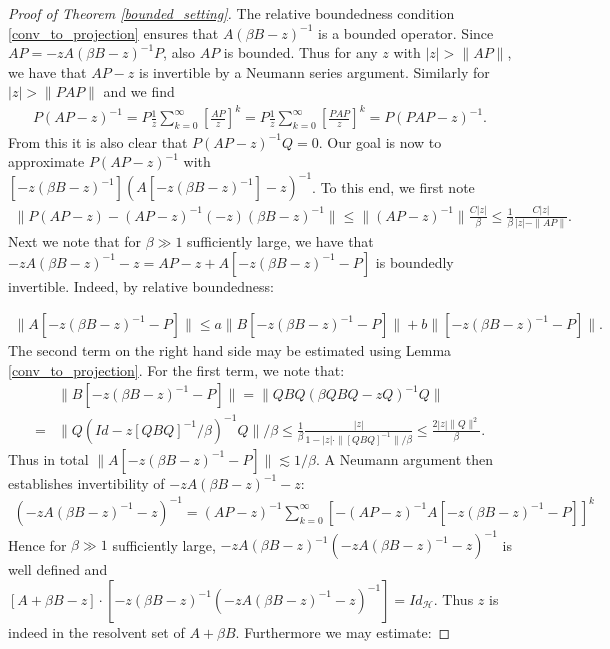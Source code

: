 \documentclass[reqno,12pt,letterpaper]{amsart}
\numberwithin{equation}{section}
\newcommand{\1}{\mathds{1}}
\theoremstyle{definition}
\begin{document}
\begin{proof}[Proof of Theorem \ref{bounded_setting}]
	The relative boundedness condition  \ref{conv_to_projection} ensures  that $A (\beta B - z)^{-1} $ is a bounded operator. Since $A P =  -z A (\beta B - z)^{-1} P$, also $AP$ is bounded.
	Thus for any $z$ with $|z| > \|AP\|$, we have that $AP - z$ is invertible by a Neumann series argument. Similarly for  $|z| > \|PAP\|$ and we find
	\begin{align}
		P(AP -z)^{-1} = P \frac1z \sum\limits_{k = 0}^{\infty} \left[ \frac{AP}{z}\right]^k = P \frac1z \sum\limits_{k = 0}^{\infty} \left[ \frac{PAP}{z}\right]^k = P(PAP -z)^{-1}.
	\end{align}
	From this it is also clear that $P(AP -z)^{-1} Q = 0$.
	Our goal is now to approximate $P(AP -z)^{-1} $ with $[-z(\beta B -z)^{-1}](A[-z(\beta B -z)^{-1}] -z)^{-1} $. To this end, we first note
	\begin{align}
		\|  P (AP -z) - (AP -z)^{-1} (-z)(\beta B - z)^{-1}  \| \leq \| (AP - z)^{-1}\| \frac{C |z|}{\beta} \leq \frac{1}{\beta} \frac{C |z|}{|z| - \|AP\|}.
	\end{align}
	Next we note that for $\beta \gg 1$ sufficiently large, we have that $-z A (\beta B -z)^{-1} - z = A P -z + A [-z (\beta B -z)^{-1}- P]$ is boundedly invertible. Indeed, by relative boundedness:
	
	\begin{align}
		\|	A [-z (\beta B -z)^{-1}- P] \| \leq a \| B [-z (\beta B -z)^{-1}- P] \| + b \| [-z (\beta B -z)^{-1}- P]\|.
	\end{align}
	The second term on the right hand side may be estimated using Lemma \ref{conv_to_projection}.
	For the first term, we note that:
	\begin{align}
		&\|B [-z (\beta B -z)^{-1}- P]\| = \|QBQ  (\beta QBQ -zQ)^{-1}Q\| \\
		=&\|Q (Id  -z[QBQ]^{-1}/\beta)^{-1}Q\|/\beta \leq \frac{1}{\beta} \frac{|z|}{1-|z| \cdot \|[QBQ]^{-1}\|/\beta} \leq \frac{2 |z| \|Q\|^2}{\beta}.
	\end{align}
	Thus in total $\|	A [-z (\beta B -z)^{-1}- P] \|  \lesssim 1/\beta$. A Neumann argument then establishes invertibility of $-zA(\beta B -z)^{-1} - z$:
	\begin{align}
		(-zA(\beta B -z)^{-1} - z)^{-1} = (AP -z )^{-1} \sum\limits_{k = 0}^{\infty} [-(AP -z )^{-1} A  [-z (\beta B -z)^{-1}- P]]^k
	\end{align}
	Hence for $\beta \gg 1$ sufficiently large, $-zA(\beta B -z)^{-1} (-zA(\beta B -z)^{-1} - z)^{-1}$ is well defined and
	$
	[A + \beta B -z]\cdot[-z(\beta B -z)^{-1} (-zA(\beta B -z)^{-1} - z)^{-1}] = Id_{\mathcal{H}}
	$.
	Thus $z $ is indeed in the resolvent set of $A + \beta B$. Furthermore we may estimate:
	

\end{proof}
\end{document}
